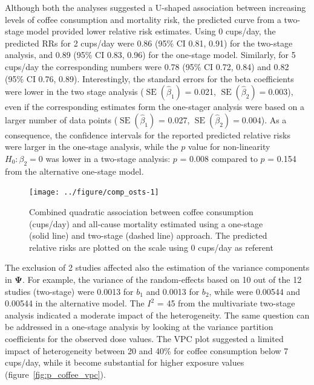 \documentclass[11pt,a4paper,twoside,openany]{book}\usepackage{knitr}
\DeclareMathOperator{\SE}{SE}
\begin{document}
{\noindent Although both the analyses suggested a U-shaped association between increasing levels of coffee consumption and mortality risk, the predicted curve from a two-stage model provided lower relative risk estimates. Using 0 cups/day, the predicted RRs for 2 cups/day were 0.86 (95\% CI 0.81, 0.91) for the two-stage analysis, and 0.89 (95\% CI 0.83, 0.96) for the one-stage model. Similarly, for 5 cups/day the corresponding numbers were 0.78 (95\% CI 0.72, 0.84) and 0.82 (95\% CI 0.76, 0.89). Interestingly, the standard errors for the beta coefficients were lower in the two stage analysis ($\SE \left(\hat \beta_1 \right)$ = 0.021, $\SE \left(\hat \beta_2 \right) = 0.003$), even if the corresponding estimates form the one-stager analysis were based on a larger number of data points ($\SE \left(\hat \beta_1 \right)$ = 0.027, $\SE \left(\hat \beta_2 \right) = 0.004$). As a consequence, the confidence intervals for the reported predicted relative risks were larger in the one-stage analysis, while the $p$ value for non-linearity $H_0: \beta_2 = 0$ was lower in a two-stage analysis: $p$ = 0.008 compared to $p$ = 0.154 from the alternative one-stage model.

\begin{knitrout}\footnotesize
{}\color{fgcolor}\begin{figure}[ht!]

{\centering \texttt{[image: ../figure/comp\_osts-1]} 

}

\caption[Combined quadratic association between coffee consumption (cups/day) and all-cause mortality estimated using a one-stage (solid line) and two-stage (dashed line) approach]{Combined quadratic association between coffee consumption (cups/day) and all-cause mortality estimated using a one-stage (solid line) and two-stage (dashed line) approach. The predicted relative risks are plotted on the scale using 0 cups/day as referent}\label{fig:comp_osts}
\end{figure}


\end{knitrout}

\noindent The exclusion of 2 studies affected also the estimation of the variance components in $\boldsymbol{\Psi}$. For example, the variance of the random-effects based on 10 out of the 12 studies (two-stage) were 0.0013 for $b_1$ and 0.0013 for $b_2$, while were 0.00544 and 0.00544 in the alternative model. The $I^2$ = 45 from the multivariate two-stage analysis indicated a moderate impact of the heterogeneity. The same question can be addressed in a one-stage analysis by looking at the variance partition coefficients for the observed dose values. The VPC plot suggested a limited impact of heterogeneity between 20 and 40\% for coffee consumption below 7 cups/day, while it become substantial for higher exposure values (figure~\ref{fig:p_coffee_vpc}).

}
\end{document}
